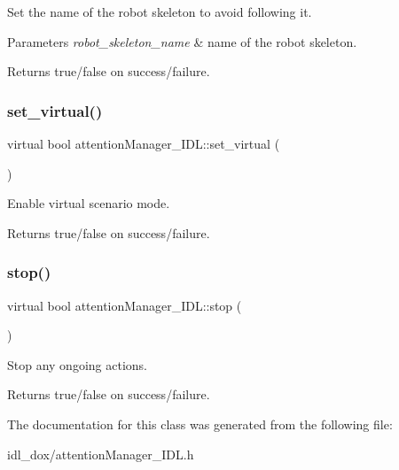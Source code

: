 Set the name of the robot skeleton to avoid following it. 


\begin{DoxyParams}{Parameters}
{\em robot\+\_\+skeleton\+\_\+name} & name of the robot skeleton. \\
\hline
\end{DoxyParams}
\begin{DoxyReturn}{Returns}
true/false on success/failure. 
\end{DoxyReturn}
\mbox{\label{classattentionManager__IDL_a9278a1d0df7c7b1c3b0aa46ef78f8009}} 
\subsubsection{\texorpdfstring{set\+\_\+virtual()}{set\_virtual()}}
{\footnotesize\ttfamily virtual bool attention\+Manager\+\_\+\+I\+D\+L\+::set\+\_\+virtual (\begin{DoxyParamCaption}{ }\end{DoxyParamCaption})\hspace{0.3cm}{\ttfamily [virtual]}}



Enable virtual scenario mode. 

\begin{DoxyReturn}{Returns}
true/false on success/failure. 
\end{DoxyReturn}
\mbox{\label{classattentionManager__IDL_aa5e3fb18a0336d8b65c316e7f6a675a8}} 
\subsubsection{\texorpdfstring{stop()}{stop()}}
{\footnotesize\ttfamily virtual bool attention\+Manager\+\_\+\+I\+D\+L\+::stop (\begin{DoxyParamCaption}{ }\end{DoxyParamCaption})\hspace{0.3cm}{\ttfamily [virtual]}}



Stop any ongoing actions. 

\begin{DoxyReturn}{Returns}
true/false on success/failure. 
\end{DoxyReturn}


The documentation for this class was generated from the following file\+:\begin{DoxyCompactItemize}
\item 
idl\+\_\+dox/attention\+Manager\+\_\+\+I\+D\+L.\+h\end{DoxyCompactItemize}
